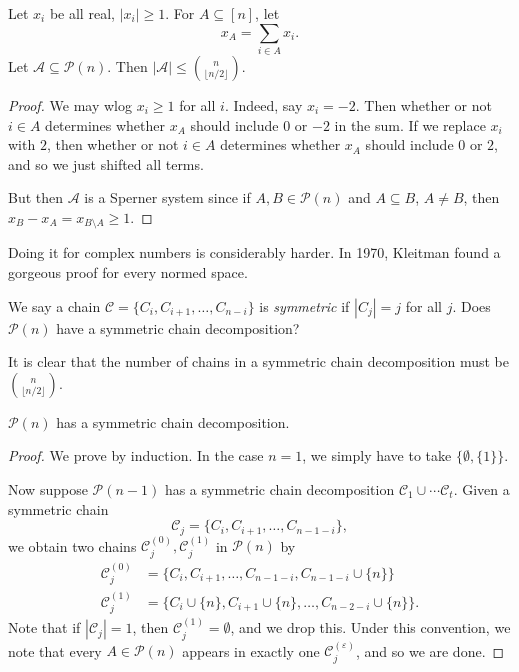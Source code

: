 \documentclass[a4paper]{article}
\begin{document}
\begin{thm}[Erd\"os, 1945]
  Let $x_i$ be all real, $|x_i| \geq 1$. For $A \subseteq [n]$, let
  \[
    x_A = \sum_{i \in A} x_i.
  \]
  Let $\mathcal{A} \subseteq \mathcal{P}(n)$. Then $|\mathcal{A}| \leq \binom{n}{\lfloor n/2\rfloor}$.
\end{thm}

\begin{proof}
  We may wlog $x_i \geq 1$ for all $i$. Indeed, say $x_i = -2$. Then whether or not $i \in A$ determines whether $x_A$ should include $0$ or $-2$ in the sum. If we replace $x_i$ with $2$, then whether or not $i \in A$ determines whether $x_A$ should include $0$ or $2$, and so we just shifted all terms.

  But then $\mathcal{A}$ is a Sperner system since if $A, B \in \mathcal{P}(n)$ and $A \subseteq B$, $A \not= B$, then $x_B - x_A = x_{B\setminus A} \geq 1$.
\end{proof}

Doing it for complex numbers is considerably harder. In 1970, Kleitman found a gorgeous proof for every normed space.

We say a chain $\mathcal{C} = \{C_i, C_{i + 1}, \ldots, C_{n - i}\}$ is \emph{symmetric} if $|C_j| = j$ for all $j$. Does $\mathcal{P}(n)$ have a symmetric chain decomposition?

It is clear that the number of chains in a symmetric chain decomposition must be $\binom{n}{\lfloor n/2\rfloor}$.

\begin{thm}
  $\mathcal{P}(n)$ has a symmetric chain decomposition.
\end{thm}

\begin{proof}
  We prove by induction. In the case $n = 1$, we simply have to take $\{\emptyset, \{1\}\}$.

  Now suppose $\mathcal{P}(n- 1)$ has a symmetric chain decomposition $\mathcal{C}_1 \cup \cdots \mathcal{C}_t$. Given a symmetric chain
  \[
    \mathcal{C}_j = \{C_i, C_{i + 1}, \ldots, C_{n - 1 - i}\},
  \]
  we obtain two chains $\mathcal{C}_j^{(0)}, \mathcal{C}_j^{(1)}$ in $\mathcal{P}(n)$ by
  \begin{align*}
    \mathcal{C}_j^{(0)} &= \{C_i, C_{i + 1}, \ldots, C_{n - 1 - i}, C_{n - 1 - i} \cup \{n\}\}\\
    \mathcal{C}_j^{(1)} &= \{C_i \cup\{n\}, C_{i + 1} \cup \{n\}, \ldots, C_{n - 2 - i} \cup \{n\}\}.
  \end{align*}
  Note that if $|\mathcal{C}_j| = 1$, then $\mathcal{C}_j^{(1)} = \emptyset$, and we drop this. Under this convention, we note that every $A \in \mathcal{P}(n)$ appears in exactly one $\mathcal{C}_j^{(\varepsilon)}$, and so we are done.
\end{proof}
\end{document}
